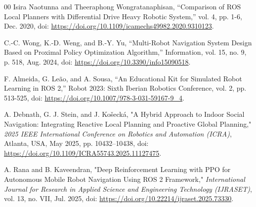 \documentclass[conference]{IEEEtran}
\begin{document}
\begin{thebibliography}{00}
 Isira Naotunna and Theeraphong Wongratanaphisan, “Comparison of ROS Local Planners with Differential Drive Heavy Robotic System,” vol. 4, pp. 1-6, Dec. 2020, doi: \url{https://doi.org/10.1109/icamechs49982.2020.9310123}.   %

 C.-C. Wong, K.-D. Weng, and B.-Y. Yu, “Multi-Robot Navigation System Design Based on Proximal Policy Optimization Algorithm,” Information, vol. 15, no. 9, p. 518, Aug. 2024, doi: \url{https://doi.org/10.3390/info15090518}. %

 F. Almeida, G. Le\~{a}o, and A. Sousa, “An Educational Kit for Simulated Robot Learning in ROS 2,” Robot 2023: Sixth Iberian Robotics Conference, vol. 2, pp. 513-525, doi: \url{https://doi.org/10.1007/978-3-031-59167-9_4}. %

 A. Debnath, G. J. Stein, and J. Ko\v{s}eck\'{a}, "A Hybrid Approach to Indoor Social Navigation: Integrating Reactive Local Planning and Proactive Global Planning," \textit{2025 IEEE International Conference on Robotics and Automation (ICRA)}, Atlanta, USA, May 2025, pp. 10432--10438, doi: \url{https://doi.org/10.1109/ICRA55743.2025.11127475}.

 A. Rana and B. Kaveendran, "Deep Reinforcement Learning with PPO for Autonomous Mobile Robot Navigation Using ROS 2 Framework," \textit{International Journal for Research in Applied Science and Engineering Technology (IJRASET)}, vol. 13, no. VII, Jul. 2025, doi: \url{https://doi.org/10.22214/ijraset.2025.73330}.

\end{thebibliography}

\end{document}
